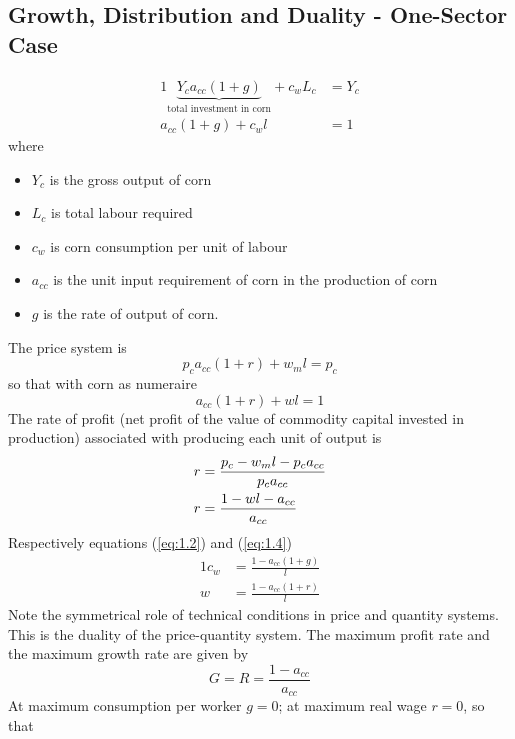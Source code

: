 \documentclass{article}
\begin{document}
\subsection{Growth, Distribution and Duality - One-Sector Case}
	\begin{alignat}{1}
		\underbrace{Y_c a_{cc}(1+g)}_{\text{total investment in corn}} + c_w L_c &= Y_c \label{eq:1.1}\\
		a_{cc} (1+g) + c_w l &= 1 \label{eq:1.2}
	\end{alignat}
	where
	\begin{itemize}
		\item \( Y_c \) is the gross output of corn
		\item \( L_c \) is total labour required
		\item \( c_w \) is corn consumption per unit of labour
		\item \( a_{cc} \) is the unit input requirement of corn in the production of corn 
		\item \( g \) is the rate of output of corn.
	\end{itemize}
	The price system is
	\begin{equation}
		p_c a_{cc} (1+r) + w_m l = p_c \label{eq:1.3}
	\end{equation}
	so that with corn as numeraire
	\begin{equation}
		a_{cc} (1+r) + wl = 1 \label{eq:1.4}
	\end{equation}
	The rate of profit (net profit of the value of commodity capital invested in production) associated with producing each unit of output is
	\begin{align}
		r &= \frac{p_c - w_m l - p_c a_{cc}}{p_c a_{cc}} \notag\\
		r &= \frac{1-wl-a_{cc}}{a_{cc}} 				 \label{eq:1.5}
	\end{align}
	Respectively equations (\ref{eq:1.2}) and (\ref{eq:1.4})
	\begin{alignat}{1}
		c_w &= \frac{1-a_{cc}(1+g)}{l} \label{eq:1.6}\\
		w   &= \frac{1-a_{cc}(1+r)}{l} \label{eq:1.7}
	\end{alignat}
	Note the symmetrical role of technical conditions in price and quantity systems. This is the duality of the price-quantity system. The maximum profit rate and the maximum growth rate are given by				
	\begin{equation}
		G = R = \frac{1-a_{cc}}{a_{cc}} \label{eq:1.8}
	\end{equation}
	At maximum consumption per worker \( g = 0 \); at maximum real wage \( r = 0 \), so that
\end{document}

